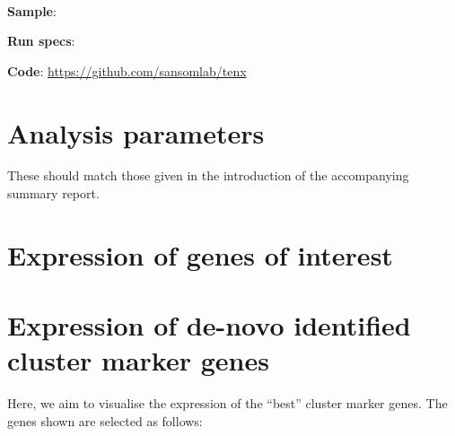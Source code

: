 \documentclass{article}
\begin{document}
\title{\reportTitle \\
  \vspace{5mm}
  \large \projectName \\
}

\author{\reportAuthor}
\maketitle


\vspace{\fill}
\noindent
{\large \textbf{Sample}: \sample}

\vspace{3mm}
\noindent
{\large \textbf{Run specs}: \runDetails}

\vspace{3mm}
\noindent
{\large \textbf{Code}: \url{https://github.com/sansomlab/tenx}}



\clearpage


\tableofcontents

\clearpage


\section{Analysis parameters}

These should match those given in the introduction of the accompanying summary report.
\vspace{5mm}

\clearpage

\section{Expression of genes of interest}

\clearpage


\section{Expression of de-novo identified cluster marker genes}

Here, we aim to visualise the expression of the ``best'' cluster marker genes. The genes shown are selected as follows:
\end{document}
